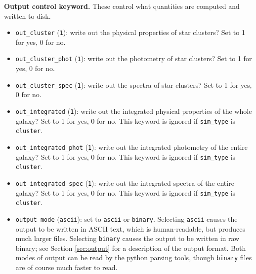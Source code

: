 \documentclass[12pt]{article}
\begin{document}
\noindent
\textbf{Output control keyword.} These control what quantities are computed and written to disk.
\begin{itemize}
\item \verb=out_cluster= (\verb=1=): write out the physical properties of star clusters? Set to 1 for yes, 0 for no.
\item \verb=out_cluster_phot= (\verb=1=): write out the photometry of star clusters? Set to 1 for yes, 0 for no.
\item \verb=out_cluster_spec= (\verb=1=): write out the spectra of star clusters? Set to 1 for yes, 0 for no.
\item \verb=out_integrated= (\verb=1=): write out the integrated physical properties of the whole galaxy? Set to 1 for yes, 0 for no. This keyword is ignored if \verb=sim_type= is \verb=cluster=.
\item \verb=out_integrated_phot= (\verb=1=): write out the integrated photometry of the entire galaxy? Set to 1 for yes, 0 for no. This keyword is ignored if \verb=sim_type= is \verb=cluster=.
\item \verb=out_integrated_spec= (\verb=1=): write out the integrated spectra of the entire galaxy? Set to 1 for yes, 0 for no. This keyword is ignored if \verb=sim_type= is \verb=cluster=.
\item \verb=output_mode= (\verb=ascii=): set to \verb=ascii= or \verb=binary=. Selecting \verb=ascii= causes the output to be written in ASCII text, which is human-readable, but produces much larger files. Selecting \verb=binary= causes the output to be written in raw binary; see Section \ref{sec:output} for a description of the output format. Both modes of output can be read by the python parsing tools, though \verb=binary= files are of course much faster to read.
\end{itemize}
\end{document}

